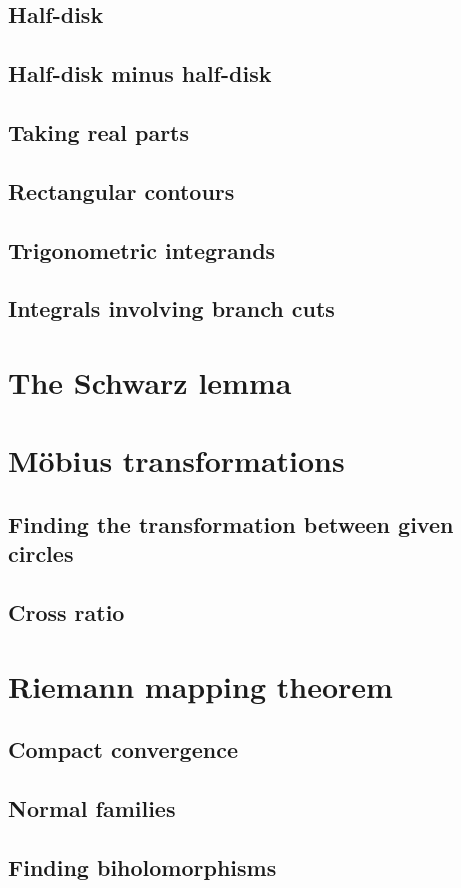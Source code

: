 \documentclass{article}
\begin{document}
\subsection{Half-disk}

\subsection{Half-disk minus half-disk}

\subsection{Taking real parts}

\subsection{Rectangular contours}

\subsection{Trigonometric integrands}

\subsection{Integrals involving branch cuts}



\section{The Schwarz lemma}


\section{M\"obius transformations}

\subsection{Finding the transformation between given circles}

\subsection{Cross ratio}



\section{Riemann mapping theorem}

\subsection{Compact convergence}

\subsection{Normal families}

\subsection{Finding biholomorphisms}
\end{document}

